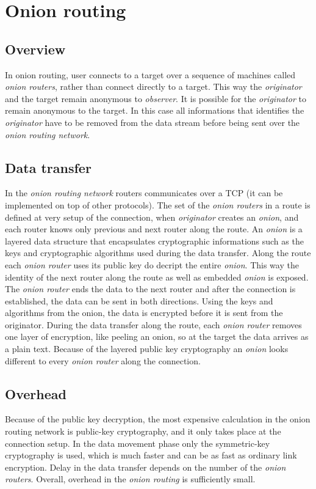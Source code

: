 \documentclass{acm_proc_article-sp}
\begin{document}
\section{Onion routing}
\subsection{Overview}

In onion routing, user connects to a target over a sequence of machines called \textit{onion routers}, rather than connect directly to a target.
This way the \textit{originator} and the target remain anonymous to \textit{observer}. It is possible for the \textit{originator} to remain anonymous
to the target. In this case all informations that identifies the \textit{originator} have to be removed from the data stream before being sent over
the \textit{onion routing network}.

\subsection{Data transfer}
In the \textit{onion routing network} routers communicates over a TCP (it can be implemented on top of other protocols). The set of the 
\textit{onion routers} in a route is defined at very setup of the connection, when \textit{originator } creates an \textit{onion}, and each router knows only previous and next router  
along the route. An \textit{onion} is a layered data structure that encapsulates cryptographic informations such as the keys and cryptographic algorithms used 
during the data transfer. Along the route each \textit{onion router} uses its public key do decript the entire \textit{onion}. This way the identity of the next router 
along the route as well as embedded \textit{onion} is exposed. The \textit{onion router} ends the data to the next router and after the connection is established, the data can be sent in both directions. Using the keys and algorithms from the onion, the data is encrypted before it is sent from the originator. During the data transfer along the route, each \textit{onion router} 
removes one layer of encryption, like peeling an onion, so at the target the data arrives as a plain text. Because of the layered public key cryptography an \textit{onion} looks different 
to every \textit{onion router} along the connection. \cite{cite3}

\subsection{Overhead}
Because of the public key decryption, the most expensive calculation in the onion routing network is public-key cryptography, and it only takes place at the connection setup. In the data movement phase only the symmetric-key cryptography is used, which is much faster and can be as fast as ordinary link encryption. Delay in the data transfer depends on the number of the \textit{onion routers}. Overall, overhead in the \textit{onion routing} is sufficiently small. \cite{cite3}
\end{document}
